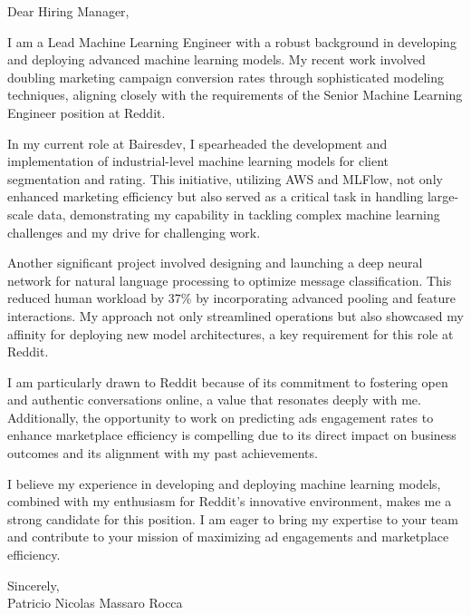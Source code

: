 \documentclass{article}
\begin{document}
\noindent Dear Hiring Manager,


I am a Lead Machine Learning Engineer with a robust background in developing and deploying advanced machine learning models. My recent work involved doubling marketing campaign conversion rates through sophisticated modeling techniques, aligning closely with the requirements of the Senior Machine Learning Engineer position at Reddit.


In my current role at Bairesdev, I spearheaded the development and implementation of industrial-level machine learning models for client segmentation and rating. This initiative, utilizing AWS and MLFlow, not only enhanced marketing efficiency but also served as a critical task in handling large-scale data, demonstrating my capability in tackling complex machine learning challenges and my drive for challenging work.


Another significant project involved designing and launching a deep neural network for natural language processing to optimize message classification. This reduced human workload by 37\% by incorporating advanced pooling and feature interactions. My approach not only streamlined operations but also showcased my affinity for deploying new model architectures, a key requirement for this role at Reddit.


I am particularly drawn to Reddit because of its commitment to fostering open and authentic conversations online, a value that resonates deeply with me. Additionally, the opportunity to work on predicting ads engagement rates to enhance marketplace efficiency is compelling due to its direct impact on business outcomes and its alignment with my past achievements.


I believe my experience in developing and deploying machine learning models, combined with my enthusiasm for Reddit's innovative environment, makes me a strong candidate for this position. I am eager to bring my expertise to your team and contribute to your mission of maximizing ad engagements and marketplace efficiency.

\vspace{1cm}
\setlength{\parskip}{0em}
\begin{flushright}
Sincerely,\\
Patricio Nicolas Massaro Rocca
\end{flushright}
\end{document}
